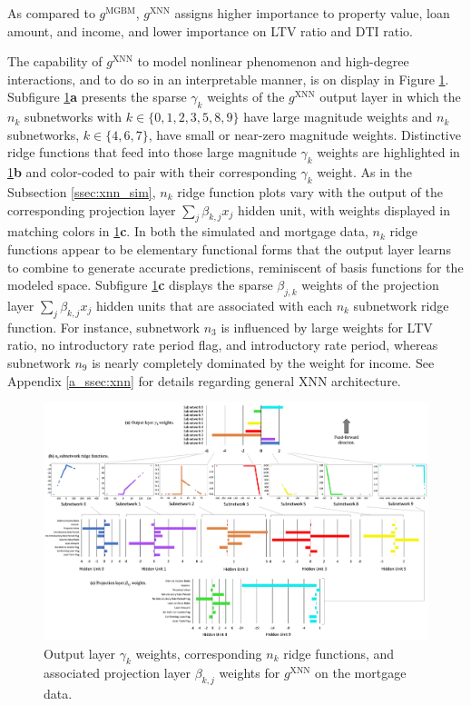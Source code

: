 \documentclass[information,article,submit,moreauthors,pdftex]{definitions/mdpi}
\begin{document}
\noindent As compared to $g^\text{MGBM}$, $g^\text{XNN}$ assigns higher importance to property value, loan amount, and income, and lower importance on LTV ratio and DTI ratio. 

The capability of $g^\text{XNN}$ to model nonlinear phenomenon and high-degree interactions, and to do so in an interpretable manner, is on display in Figure \ref{fig:mort_xnn_glob_ridge}. Subfigure \ref{fig:mort_xnn_glob_ridge}\textbf{a} presents the sparse $\gamma_k$ weights of the $g^\text{XNN}$ output layer in which the $n_k$ subnetworks with $k \in \{0,1,2,3,5,8,9\}$ have large magnitude weights and $n_k$ subnetworks, $k \in \{4,6,7\}$, have small or near-zero magnitude weights. Distinctive ridge functions that feed into those large magnitude $\gamma_k$ weights are highlighted in \ref{fig:mort_xnn_glob_ridge}\textbf{b} and color-coded to pair with their corresponding $\gamma_k$ weight. As in the Subsection \ref{ssec:xnn_sim}, $n_k$ ridge function plots vary with the output of the corresponding projection layer $\sum_j\beta_{k,j}x_j$ hidden unit, with weights displayed in matching colors in \ref{fig:mort_xnn_glob_ridge}\textbf{c}. In both the simulated and mortgage data, $n_k$ ridge functions appear to be elementary functional forms that the output layer learns to combine to generate accurate predictions, reminiscent of basis functions for the modeled space. Subfigure \ref{fig:mort_xnn_glob_ridge}\textbf{c} displays the sparse $\beta_{j,k}$ weights of the projection layer $\sum_j\beta_{k,j}x_j$ hidden units that are associated with each $n_k$ subnetwork ridge function. For instance, subnetwork $n_3$ is influenced by large weights for LTV ratio, no introductory rate period flag, and introductory rate period, whereas subnetwork $n_9$ is nearly completely dominated by the weight for income. See Appendix \ref{a_ssec:xnn} for details regarding general XNN architecture.

\begin{figure}[htb]
\hskip-35pt\includegraphics[width=19cm]{img/mort_xnn_glob_ridge.png}
\caption{Output layer $\gamma_k$ weights, corresponding $n_k$ ridge functions, and associated projection layer $\beta_{k,j}$ weights for $g^\text{XNN}$ on the mortgage data.}
\label{fig:mort_xnn_glob_ridge}
\end{figure} 
\end{document}
